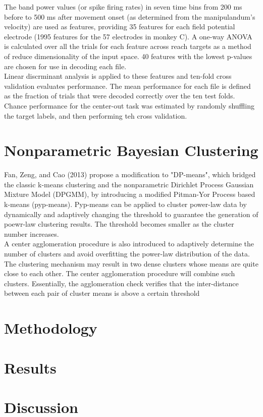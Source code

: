 \documentclass{article}
\begin{document}
\noindent
The band power values (or spike firing rates) in seven time bins from 200 ms before to 500 ms after movement onset (as determined from the manipulandum's velocity) are used as features, providing 35 features for each field potential electrode (1995 features for the 57 electrodes in monkey C).  A one-way ANOVA is calculated over all the trials for each feature across reach targets as a method of reduce dimensionality of the input space.  40 features with the lowest p-values are chosen for use in decoding each file.  \\

\noindent
Linear discrminant analysis is applied to these features and ten-fold cross validation evaluates performance.  The mean performance for each file is defined as the fraction of trials that were decoded correctly over the ten test folds.  Chance performance for the center-out task was estimated by randomly shuffling the target labels, and then performing teh cross validation.

\section{Nonparametric Bayesian Clustering}
\noindent
Fan, Zeng, and Cao (2013) propose a modification to "DP-means", which bridged the classic k-means clustering and the nonparametric Dirichlet Process Gaussian Mixture Model (DPGMM), by introducing a modified Pitman-Yor Process based k-means (pyp-means).  Pyp-means can be applied to cluster power-law data by dynamically and adaptively changing the threshold to guarantee the generation of poewr-law clustering results.  The threshold becomes smaller as the cluster number increases.  \\

\noindent
A center agglomeration procedure is also introduced to adaptively determine the number of clusters and avoid overfitting the power-law distribution of the data.  The clustering mechanism may result in two dense clusters whose means are quite close to each other.  The center agglomeration procedure will combine such clusters.  Essentially, the agglomeration check verifies that the inter-distance between each pair of cluster means is above a certain threshold 


\section{Methodology}


\section{Results}

\section{Discussion}
\end{document}

